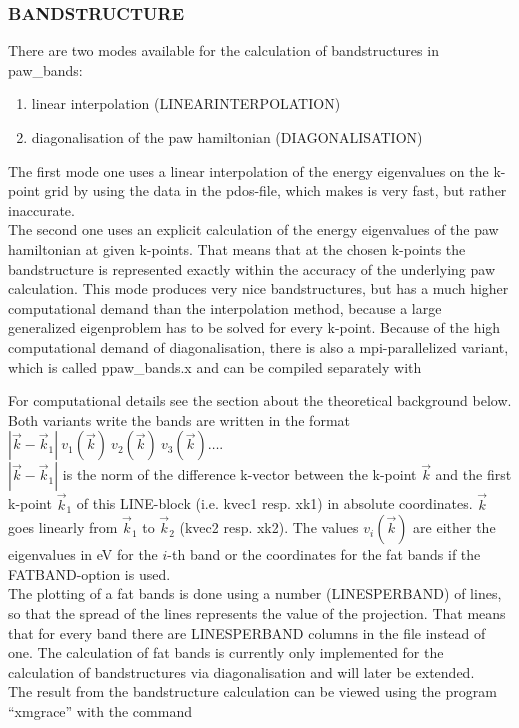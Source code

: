 \documentclass[final,12pt,makeidx,DIV=calc]{article}
\begin{document}
{{{{{{\subsubsection{BANDSTRUCTURE}
There are two modes available for the calculation of bandstructures in 
paw\_bands:
\begin{enumerate}
  \item linear interpolation (LINEARINTERPOLATION)
  \item diagonalisation of the paw hamiltonian (DIAGONALISATION)
\end{enumerate}
The first mode one uses a linear interpolation of the energy eigenvalues on the
k-point grid by using the data in the pdos-file, which makes is very fast, but
rather inaccurate. \\ The second one uses an explicit calculation of the energy
eigenvalues of the paw hamiltonian at given k-points. That means that at the
chosen k-points the bandstructure is represented exactly within the accuracy of
the underlying paw calculation. This mode produces very nice bandstructures, but
has a much higher computational demand than the interpolation method, because a
large generalized eigenproblem has to be solved for every k-point. Because of
the high computational demand of diagonalisation, there is also a
mpi-parallelized variant, which is called ppaw\_bands.x and can be compiled
separately with 

\bigskip{}\bigskip

\noindent
For computational details see the section about
the theoretical background below.\\
Both variants write the bands are written in the format 
$|\vec k-\vec k_1|\ v_1(\vec k)\ v_2(\vec k)\ v_3(\vec k) \ldots $.\\
 $|\vec k-\vec k_1|$ is the norm of the difference k-vector between 
the k-point $\vec k$ and the first k-point $\vec k_1$ of this 
LINE-block (i.e. kvec1 resp. xk1) in absolute coordinates. $\vec k$ 
goes linearly from $\vec k_1$ to $\vec k_2$ (kvec2 resp. xk2).
The values $v_i(\vec k)$ are either the eigenvalues in eV for the 
$i$-th band or the coordinates for the fat bands if the 
FATBAND-option is used.\\
The plotting of a fat bands is done using a number (LINESPERBAND) of lines,
so that the spread of the lines represents the value of the projection. 
That means that for every band there are LINESPERBAND columns in the file 
instead of one. The calculation of fat bands is currently only implemented
for the calculation of bandstructures via diagonalisation and will
later be extended.\\
The result from the bandstructure calculation can be viewed using 
the program ``xmgrace'' with the command

}}}}}}
\end{document}
